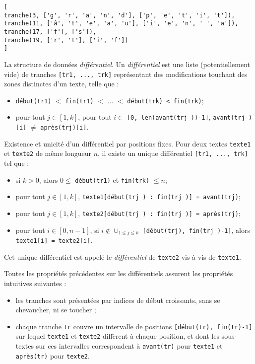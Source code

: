 \begin{lstlisting}
[
tranche(3, ['g', 'r', 'a', 'n', 'd'], ['p', 'e', 't', 'i', 't']),
tranche(11, ['â', 't', 'e', 'a', 'u'], ['i', 'e', 'n', ' ', 'a']),
tranche(17, ['f'], ['s']),
tranche(19, ['r', 't'], ['i', 'f'])
]
\end{lstlisting}

\begin{defi}{La structure de données \textit{différentiel}}. Un \textit{différentiel} est une liste (potentiellement vide)
de tranches \lstinline{[tr1, ..., trk]} représentant des modifications touchant des zones distinctes d'un
texte, telle que :
\begin{itemize}
\item \lstinline{début(tr1)} $<$ \lstinline{fin(tr1)} $<$ ... $<$ \lstinline{début(trk) < fin(trk)};
\item pour tout $j \in [1, k]$, pour tout $i \in$ \lstinline{[0, len(avant(trj ))-1]}, \lstinline{avant(trj )[i]} $\neq$ \lstinline{après(trj)[i]}.  
\end{itemize}
\end{defi}

\begin{prop}{Existence et unicité d'un différentiel par positions fixes.} Pour deux textes \lstinline{texte1} et
\lstinline{texte2} de même longueur $n$, il existe un unique différentiel \lstinline{[tr1, ..., trk]} tel que :
\begin{itemize}
\item si $k > 0$, alors $0 \leq$ \lstinline{début(tr1)} et \lstinline{fin(trk)} $\leq n $;
\item pour tout $j \in [1, k]$, \lstinline{texte1[début(trj ) : fin(trj )] = avant(trj)};
\item pour tout $j \in [1, k]$, \lstinline{texte2[début(trj ) : fin(trj )] = après(trj)};
\item pour tout $i \in [0, n-1]$, si $i \notin \cup_{1\leq j \leq k}$
\lstinline{[début(trj), fin(trj )-1]}, alors \lstinline{texte1[i] = texte2[i]}.
\end{itemize}
\end{prop}

Cet unique différentiel est appelé le \textit{différentiel} de \lstinline{texte2} vis-à-vis de \lstinline{texte1}.

Toutes les propriétés précédentes sur les différentiels assurent les propriétés intuitives suivantes :
\begin{itemize}
\item les tranches sont présentées par indices de début croissants, sans se chevaucher, ni se toucher ;
\item chaque tranche \lstinline{tr} couvre un intervalle de positions \lstinline{[début(tr), fin(tr)-1]} sur lequel 
\lstinline{texte1} et \lstinline{texte2} diffèrent à chaque position, et dont les sous-textes sur ces intervalles
correspondent à \lstinline{avant(tr)} pour \lstinline{texte1} et \lstinline{après(tr)} pour \lstinline{texte2}.
\end{itemize}


